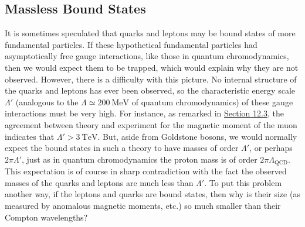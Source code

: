 \subsection[Massless Bound States]{Massless Bound States\footnotemark}
\label{sec:22.5}

It is sometimes speculated that quarks and leptons may be bound states of
more fundamental particles. If these hypothetical fundamental particles
had asymptotically free gauge interactions, like those in quantum
chromodynamics, then we would expect them to be trapped, which would
explain why they are not observed. However, there is a difficulty with this
picture. No internal structure of the quarks and leptons has ever been
observed, so the characteristic energy scale $\Lambda'$ (analogous to the
$\Lambda\simeq200\ \mathrm{MeV}$ of quantum chromodynamics) of these gauge
interactions must be very high. For instance, as remarked in
\hyperref[sec:12.3]{Section 12.3}, the agreement between theory and
experiment for the magnetic moment of the muon indicates that
$\Lambda'>3\ \mathrm{TeV}$. But, aside from Goldstone bosons, we would
normally expect the bound states in such a theory to have masses of order
$\Lambda'$, or perhaps $2\pi\Lambda'$, just as in quantum chromodynamics
the proton mass is of order $2\pi\Lambda_{\mathrm{QCD}}$. This expectation
is of course in sharp contradiction with the fact the observed masses of
the quarks and leptons are much less than $\Lambda'$. To put this problem
another way, if the leptons and quarks are bound states, then why is their
size (as measured by anomalous magnetic moments, etc.) so much smaller than
their Compton wavelengths?


